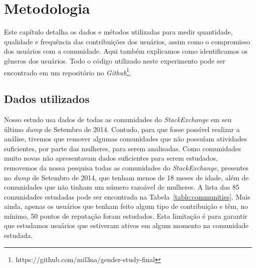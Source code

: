 \chapter{Metodologia}

Este capítulo detalha os dados e métodos utilizadas para medir quantidade, qualidade e frequência das contribuições dos usuários, assim como o compromisso dos usuários com a comunidade. Aqui também explicamos como identificamos os gêneros dos usuários. Todo o código utilizado neste experimento pode ser encontrado em um repositório no \emph{Github}\footnote{https://github.com/mil3na/gender-study-final}. 

\section{Dados utilizados}

Nosso estudo usa dados de todas as comunidades do \emph{StackExchange} em seu último \emph{dump} de Setembro de 2014. Contudo, para que fosse possível realizar a análise, tivemos que remover  algumas comunidades que  não possuíam atividades suficientes, por parte das mulheres, para serem analisadas. Como comunidades muito novas não apresentavam dados suficientes para serem estudados, removemos da nossa pesquisa todas as comunidades do \emph{StackExchange}, presentes no \emph{dump} de Setembro de 2014, que tenham menos de 18 meses de idade, além de comunidades que não tinham um número razoável de mulheres. A lista das 85 comunidades estudadas pode ser encontrada na Tabela~\ref{table:communities}. Mais ainda, apenas os usuários que tenham feito algum tipo de contribuição e têm, no mínimo, 50 pontos de reputação foram estudados. Esta limitação é para garantir que estudamos usuários que estiveram ativos em algum momento na comunidade estudada.

